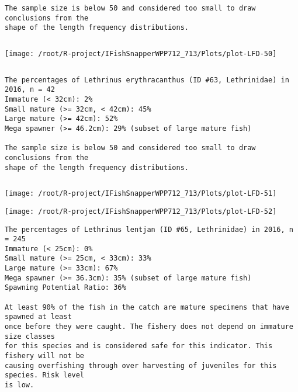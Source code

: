 \documentclass{report}\usepackage[]{graphicx}\usepackage[]{color}
\makeatletter
\def\maxwidth{ %
  \ifdim\Gin@nat@width>\linewidth
    \linewidth
  \else
    \Gin@nat@width
  \fi
}
\newenvironment{kframe}{%
 \def\at@end@of@kframe{}%
 \ifinner\ifhmode%
  \def\at@end@of@kframe{\end{minipage}}%
  \begin{minipage}{\columnwidth}%
 \fi\fi%
 \def\FrameCommand##1{\hskip\@totalleftmargin \hskip-\fboxsep
 \colorbox{shadecolor}{##1}\hskip-\fboxsep
     \hskip-\linewidth \hskip-\@totalleftmargin \hskip\columnwidth}%
 \MakeFramed {\advance\hsize-\width
   \@totalleftmargin\z@ \linewidth\hsize
   \@setminipage}}%
 {\par\unskip\endMakeFramed%
 \at@end@of@kframe}
\newenvironment{knitrout}{}{} %
\makeatother
\begin{document}
\begin{knitrout}
\begin{kframe}
\begin{verbatim}
The sample size is below 50 and considered too small to draw conclusions from the
shape of the length frequency distributions.
\end{verbatim}
\end{kframe}
\newpage
\begin{kframe}\begin{verbatim}
\end{verbatim}
\end{kframe}
\texttt{[image: /root/R-project/IFishSnapperWPP712\_713/Plots/plot-LFD-50]} 
\begin{kframe}\begin{verbatim}
\end{verbatim}
\end{kframe}
\clearpage
\newpage
\begin{kframe}\begin{verbatim}
The percentages of Lethrinus erythracanthus (ID #63, Lethrinidae) in 2016, n = 42
Immature (< 32cm): 2%
Small mature (>= 32cm, < 42cm): 45%
Large mature (>= 42cm): 52%
Mega spawner (>= 46.2cm): 29% (subset of large mature fish)
 
The sample size is below 50 and considered too small to draw conclusions from the
shape of the length frequency distributions.
\end{verbatim}
\end{kframe}
\newpage
\begin{kframe}\begin{verbatim}
\end{verbatim}
\end{kframe}
\texttt{[image: /root/R-project/IFishSnapperWPP712\_713/Plots/plot-LFD-51]} 

\texttt{[image: /root/R-project/IFishSnapperWPP712\_713/Plots/plot-LFD-52]} 
\begin{kframe}\begin{verbatim}
The percentages of Lethrinus lentjan (ID #65, Lethrinidae) in 2016, n = 245
Immature (< 25cm): 0%
Small mature (>= 25cm, < 33cm): 33%
Large mature (>= 33cm): 67%
Mega spawner (>= 36.3cm): 35% (subset of large mature fish)
Spawning Potential Ratio: 36%
 
At least 90% of the fish in the catch are mature specimens that have spawned at least
once before they were caught. The fishery does not depend on immature size classes
for this species and is considered safe for this indicator. This fishery will not be
causing overfishing through over harvesting of juveniles for this species. Risk level
is low.


\end{verbatim}
\end{kframe}
\end{knitrout}
\end{document}
